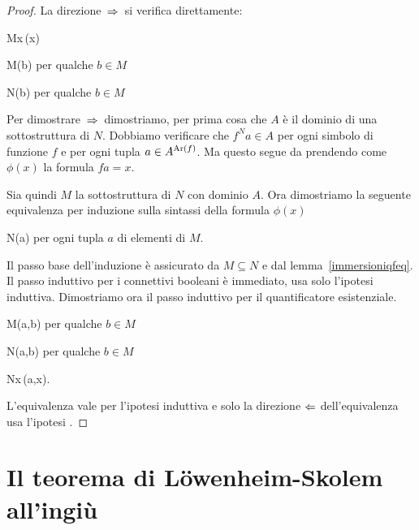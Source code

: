 \begin{proof}
La direzione $\,\Rightarrow\,$ si verifica direttamente:

%
{\IMP}%
{M\models\E x\,\phi(x)}

\ceq{}%
{\IMP}%
{M\models\phi(b)} per qualche $b\in M$

\ceq{}%
{\IMP}%
{N\models\phi(b)} per qualche $b\in M$

Per dimostrare $\,\Rightarrow\,$ dimostriamo, per prima cosa che $A$ \`e il dominio di una sottostruttura di $N$. Dobbiamo verificare che $f^Na\in A$ per ogni simbolo di funzione $f$ e per ogni tupla $a \in A^{{\rm Ar}(f)}$. Ma questo segue da  prendendo come $\phi(x)$ la formula $fa=x$. 

Sia quindi $M$ la sottostruttura di $N$ con dominio $A$. Ora dimostriamo la seguente equivalenza per induzione sulla sintassi della formula $\phi(x)$ 

%
{\IFF}%
{N\models\phi(a)} per ogni tupla $a$ di elementi di $M$.

Il passo base dell'induzione \`e assicurato da $M\subseteq N$ e dal lemma~\ref{immersioniqfeq}. Il passo induttivo per i connettivi booleani \`e immediato, usa solo l'ipotesi induttiva. Dimostriamo ora il passo induttivo per il quantificatore esistenziale.

%
{\IFF}%
{M\models\phi(a,b)} per qualche $b\in M$

%
{\IFF}%
{N\models\phi(a,b)} per qualche $b\in M$

%
{\IFF}%
{N\models\E x\,\phi(a,x).}

L'equivalenza  vale per l'ipotesi induttiva e solo la direzione $\Leftarrow$ dell'equivalenza  usa l'ipotesi .
\end{proof}

\section{Il teorema di L\"owenheim-Skolem all'ingi\`u}
\label{LoewenheimSkolem}

